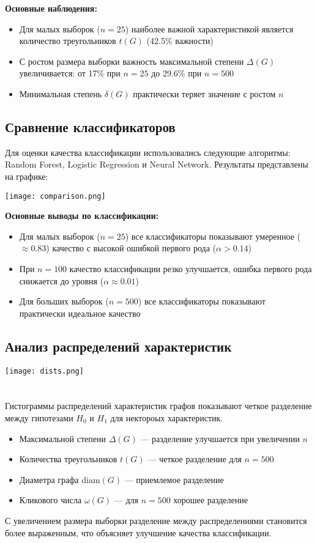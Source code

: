 \documentclass[12pt,a4paper]{article}
\begin{document}
\textbf{Основные наблюдения:}
\begin{itemize}
    \item Для малых выборок ($n=25$) наиболее важной характеристикой является количество треугольников $t(G)$ (42.5\% важности)
    \item С ростом размера выборки важность максимальной степени $\Delta(G)$ увеличивается: от 17\% при $n=25$ до 29.6\% при $n=500$
    \item Минимальная степень $\delta(G)$ практически теряет значение с ростом $n$
\end{itemize}

\vfill

    
\subsection{Сравнение классификаторов}

Для оценки качества классификации использовались следующие алгоритмы: Random Forest, Logistic Regression и Neural Network. Результаты представлены на графике:

\texttt{[image: comparison.png]}

\textbf{Основные выводы по классификации:}
\begin{itemize}
    \item Для малых выборок ($n=25$) все классификаторы показывают умеренное ($\approx0.83$) качество с высокой ошибкой первого рода ($\alpha > 0.14$)
    \item При $n=100$ качество классификации резко улучшается, ошибка первого рода снижается до уровня ($\alpha \approx 0.01$)
    \item Для больших выборок ($n=500$) все классификаторы показывают практически идеальное качество
\end{itemize}

\subsection{Анализ распределений характеристик}
\texttt{[image: dists.png]}\\\\\\
Гистограммы распределений характеристик графов показывают четкое разделение между гипотезами $H_0$ и $H_1$ для нектороых характеристик.
\begin{itemize}
    \item Максимальной степени $\Delta(G)$ --- разделение улучшается при увеличении $n$
    \item Количества треугольников $t(G)$ --- четкое разделение для $n=500$
    \item Диаметра графа $\text{diam}(G)$ --- приемлемое разделение
    \item Кликового числа $\omega(G)$ --- для $n=500$ хорошее разделение
\end{itemize}
С увеличением размера выборки разделение между распределениями становится более выраженным, что объясняет улучшение качества классификации.
\end{document}
